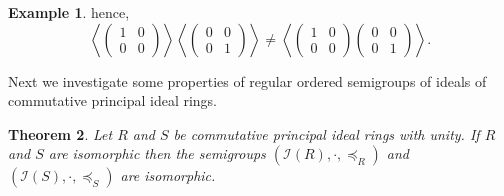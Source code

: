 \documentclass[12pt,a4paper]{amsart}
\theoremstyle{plain}
\newtheorem{theorem}{Theorem}[section]
\theoremstyle{definition}
\newtheorem{example}[theorem]{Example}
\begin{document}
\begin{example}
	hence,
	\[
	\left\langle
	\begin{pmatrix}
		1 & 0\\
		0 & 0
	\end{pmatrix}
	\right\rangle
	\left\langle
	\begin{pmatrix}
		0 & 0\\
		0 & 1
	\end{pmatrix}
	\right\rangle
	\neq
	\left\langle
	\begin{pmatrix}
		1 & 0\\
		0 & 0
	\end{pmatrix}
	\begin{pmatrix}
		0 & 0\\
		0 & 1
	\end{pmatrix}
	\right\rangle.
	\]
\end{example}

Next we investigate some properties of regular ordered semigroups of ideals of commutative principal ideal rings.

\begin{theorem}
	Let $R$ and $S$ be commutative principal ideal rings with unity.
	If $R$ and $S$ are isomorphic then the semigroups
	$(\mathcal{I}(R), \cdot , \preccurlyeq_{R})$ and
	$(\mathcal{I}(S), \cdot , \preccurlyeq_{S})$ are isomorphic.
\end{theorem}
\end{document}
